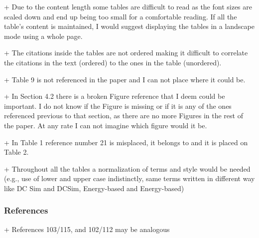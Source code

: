 


+ Due to the content length some tables are difficult to read as the
font sizes are scaled down and end up being too small for a
comfortable reading. If all the table's content is maintained, I would
suggest displaying the tables in a landscape mode using a whole page.


+ The citations inside the tables are not ordered making it difficult
to correlate the citations in the text (ordered) to the ones in the
table (unordered).


+ Table 9 is not referenced in the paper and I can not place where it
could be.


+ In Section 4.2 there is a broken Figure reference that I deem could
be important. I do not know if the Figure is missing or if it is any
of the ones referenced previous to that section, as there are no more
Figures in the rest of the paper. At any rate I can not imagine which
figure would it be.


+ In Table 1 reference number 21 is misplaced, it belongs to and it is
placed on Table 2.


+ Throughout all the tables a normalization of terms and style would
be needed (e.g., use of lower and upper case indistinctly, same terms
written in different way like DC Sim and DCSim,
Energy-based and
Energy-based)




\subsubsection{References}

+ References 103/115, and 102/112 may be analogous

